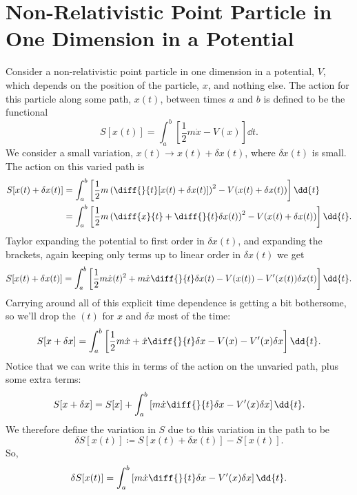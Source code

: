 \documentclass[fleqn]{NotesClass}
\begin{document}
    \section[Non-Relativistic Point Particle in One Dimension in a Potential][First Example]{Non-Relativistic Point Particle in One Dimension in a Potential}
    Consider a non-relativistic point particle in one dimension in a potential, \(V\), which depends on the position of the particle, \(x\), and nothing else.
    The action for this particle along some path, \(x(t)\), between times \(a\) and \(b\) is defined to be the functional
    \begin{equation}
        S[x(t)] = \int_a^b \left[ \frac{1}{2}m\dot{x} - V(x) \right] \dd{t}.
    \end{equation}
    We consider a small variation, \(x(t) \to x(t) + \delta x(t)\), where \(\delta x(t)\) is small.
    The action on this varied path is
    \begin{align}
        S[x(t) + \delta x(t)] &= \int_a^b \left[ \frac{1}{2}m \left( \diff{}{t} [x(t) + \delta x(t)] \right)^2 - V(x(t) + \delta x(t)) \right] \dd{t} \notag\\
        &= \int_a^b \left[ \frac{1}{2}m\left( \diff{x}{t} + \diff{}{t}\delta x(t) \right)^2 - V(x(t) + \delta x(t)) \right] \dd{t}.
    \end{align}
    Taylor expanding the potential to first order in \(\delta x(t)\), and expanding the brackets, again keeping only terms up to linear order in \(\delta x(t)\) we get
    \begin{equation}
        S[x(t) + \delta x(t)] = \int_a^b \left[ \frac{1}{2}m\dot{x}(t)^2 + m\dot{x} \diff{}{t}\delta x(t) - V(x(t)) - V'(x(t))\delta x(t) \right] \dd{t}.
    \end{equation}
    Carrying around all of this explicit time dependence is getting a bit bothersome, so we'll drop the \((t)\) for \(x\) and \(\delta x\) most of the time:
    \begin{equation}
        S[x + \delta x] = \int_a^b \left[ \frac{1}{2}m \dot{x} + \dot{x} \diff{}{t}\delta x - V(x) - V'(x)\delta x \right] \dd{t}.
    \end{equation}
    Notice that we can write this in terms of the action on the unvaried path, plus some extra terms:
    \begin{equation}
        S[x + \delta x] = S[x] + \int_a^b \left[ m \dot{x} \diff{}{t}\delta x - V'(x)\delta x \right] \dd{t}.
    \end{equation}
    We therefore define the variation in \(S\) due to this variation in the path to be
    \begin{equation}
        \delta S[x(t)] \coloneqq S[x(t) + \delta x(t)] - S[x(t)].
    \end{equation}
    So,
    \begin{equation}\label{eqn:variation in action}
        \delta S[x(t)] = \int_a^b \left[ m \dot{x} \diff{}{t}\delta x - V'(x)\delta x \right] \dd{t}.
    \end{equation}
    
\end{document}
